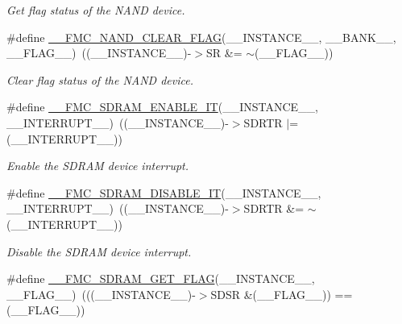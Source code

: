 \begin{DoxyCompactItemize}
\begin{DoxyCompactList}\small\item\em Get flag status of the N\+A\+ND device. \end{DoxyCompactList}\item 
\#define \hyperlink{group___f_m_c___l_l___flag___interrupt___macros_ga56022a23569bc5aed85a277a6c2bcde7}{\+\_\+\+\_\+\+F\+M\+C\+\_\+\+N\+A\+N\+D\+\_\+\+C\+L\+E\+A\+R\+\_\+\+F\+L\+AG}(\+\_\+\+\_\+\+I\+N\+S\+T\+A\+N\+C\+E\+\_\+\+\_\+,  \+\_\+\+\_\+\+B\+A\+N\+K\+\_\+\+\_\+,  \+\_\+\+\_\+\+F\+L\+A\+G\+\_\+\+\_\+)~((\+\_\+\+\_\+\+I\+N\+S\+T\+A\+N\+C\+E\+\_\+\+\_\+)-\/$>$SR \&= $\sim$(\+\_\+\+\_\+\+F\+L\+A\+G\+\_\+\+\_\+))
\begin{DoxyCompactList}\small\item\em Clear flag status of the N\+A\+ND device. \end{DoxyCompactList}\item 
\#define \hyperlink{group___f_m_c___l_l___flag___interrupt___macros_gad1855e98b4d5300dc74042fa65f248be}{\+\_\+\+\_\+\+F\+M\+C\+\_\+\+S\+D\+R\+A\+M\+\_\+\+E\+N\+A\+B\+L\+E\+\_\+\+IT}(\+\_\+\+\_\+\+I\+N\+S\+T\+A\+N\+C\+E\+\_\+\+\_\+,  \+\_\+\+\_\+\+I\+N\+T\+E\+R\+R\+U\+P\+T\+\_\+\+\_\+)~((\+\_\+\+\_\+\+I\+N\+S\+T\+A\+N\+C\+E\+\_\+\+\_\+)-\/$>$S\+D\+R\+TR $\vert$= (\+\_\+\+\_\+\+I\+N\+T\+E\+R\+R\+U\+P\+T\+\_\+\+\_\+))
\begin{DoxyCompactList}\small\item\em Enable the S\+D\+R\+AM device interrupt. \end{DoxyCompactList}\item 
\#define \hyperlink{group___f_m_c___l_l___flag___interrupt___macros_ga61bc780f3e521a19d21dcb581c7e8fb8}{\+\_\+\+\_\+\+F\+M\+C\+\_\+\+S\+D\+R\+A\+M\+\_\+\+D\+I\+S\+A\+B\+L\+E\+\_\+\+IT}(\+\_\+\+\_\+\+I\+N\+S\+T\+A\+N\+C\+E\+\_\+\+\_\+,  \+\_\+\+\_\+\+I\+N\+T\+E\+R\+R\+U\+P\+T\+\_\+\+\_\+)~((\+\_\+\+\_\+\+I\+N\+S\+T\+A\+N\+C\+E\+\_\+\+\_\+)-\/$>$S\+D\+R\+TR \&= $\sim$(\+\_\+\+\_\+\+I\+N\+T\+E\+R\+R\+U\+P\+T\+\_\+\+\_\+))
\begin{DoxyCompactList}\small\item\em Disable the S\+D\+R\+AM device interrupt. \end{DoxyCompactList}\item 
\#define \hyperlink{group___f_m_c___l_l___flag___interrupt___macros_gabc8c6163b78fd62615941cb42cb731fc}{\+\_\+\+\_\+\+F\+M\+C\+\_\+\+S\+D\+R\+A\+M\+\_\+\+G\+E\+T\+\_\+\+F\+L\+AG}(\+\_\+\+\_\+\+I\+N\+S\+T\+A\+N\+C\+E\+\_\+\+\_\+,  \+\_\+\+\_\+\+F\+L\+A\+G\+\_\+\+\_\+)~(((\+\_\+\+\_\+\+I\+N\+S\+T\+A\+N\+C\+E\+\_\+\+\_\+)-\/$>$S\+D\+SR \&(\+\_\+\+\_\+\+F\+L\+A\+G\+\_\+\+\_\+)) == (\+\_\+\+\_\+\+F\+L\+A\+G\+\_\+\+\_\+))

\end{DoxyCompactItemize}
